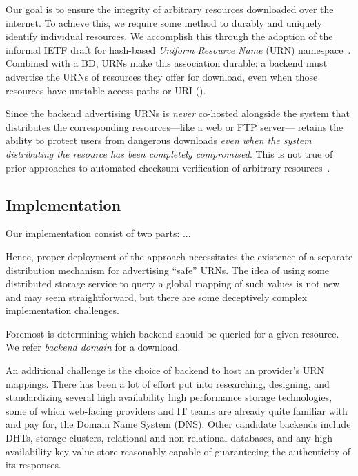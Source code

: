 Our goal is to ensure the integrity of arbitrary resources downloaded over the
internet. To achieve this, we require some method to durably and uniquely
identify individual resources. We accomplish this through the adoption of the
informal IETF draft for hash-based \emph{Uniform Resource Name} (URN)
namespace~\cite{draft-URN}. Combined with a BD, URNs make this association
durable: a backend must advertise the URNs of resources they offer for download,
even when those resources have unstable access paths or URI ().

Since the backend advertising URNs is \emph{never} co-hosted alongside the
system that distributes the corresponding resources---like a web or FTP
server---\SYSTEM{} retains the ability to protect users from dangerous downloads
\emph{even when the system distributing the resource has been completely
compromised}. This is not true of prior approaches to automated checksum
verification of arbitrary resources~\cite{Cherubini}.

\subsection{Implementation}

Our \SYSTEM{} implementation consist of two parts: ...


Hence, proper deployment of the \SYSTEM{} approach necessitates the existence of
a separate distribution mechanism for advertising ``safe'' URNs. The idea of
using some distributed storage service to query a global mapping of such values
is not new and may seem straightforward, but there are some deceptively complex
implementation challenges.

Foremost is determining which backend should be queried for a
given resource. We refer \emph{backend domain} for a download. 

An additional challenge is the choice of backend to host an
provider's URN mappings. There has been a lot of effort put into researching,
designing, and standardizing several high availability high performance storage
technologies, some of which web-facing providers and IT teams are already quite
familiar with and pay for, \eg the Domain Name System (DNS). Other candidate
backends include DHTs, storage clusters, relational and
non-relational databases, and any high availability key-value store reasonably
capable of guaranteeing the authenticity of its responses.

